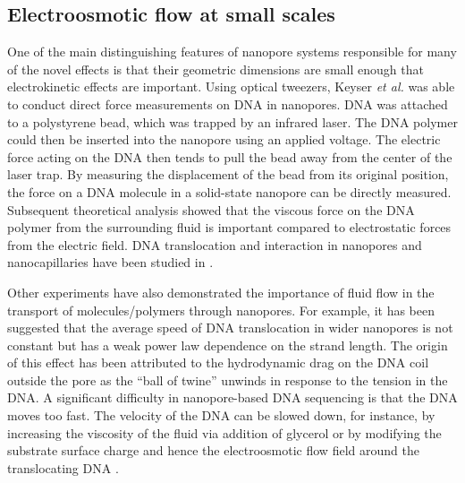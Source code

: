 \subsection{Electroosmotic flow at small scales}
One of the main distinguishing features of nanopore systems responsible for many of the novel effects is that their geometric dimensions are small enough that electrokinetic effects are important. Using optical tweezers, Keyser {\it et al.} \cite{Keyser2006,VanDorp2009} was able to conduct direct force measurements on DNA in nanopores. DNA was attached to a polystyrene bead, which was trapped by an infrared laser. The DNA polymer could then be inserted into the nanopore using an applied voltage. The electric force acting on the DNA then tends to pull the bead away from the center of the laser trap. By measuring the displacement of the bead from its original position, the force on a DNA molecule in a solid-state nanopore can be directly measured. Subsequent theoretical analysis \cite{ghosal2006electrophoresis,ghosal2007effect,Ghosal2007} showed that the viscous force on the DNA polymer from the surrounding fluid is important compared to electrostatic forces from the electric field. DNA translocation and interaction in nanopores and nanocapillaries have been studied in \cite{laohakunakorn2013dna,thacker2012studying,ghosal2012capstan}.

Other experiments have also demonstrated the importance of fluid flow in the transport of molecules\//polymers through nanopores. For example, it has been suggested that the average speed of DNA translocation 
in wider nanopores \cite{storm_nanolett05} is not constant but has a weak power law dependence on the strand length. 
The origin of this effect has been attributed to the hydrodynamic drag on the DNA coil outside the pore as the ``ball of twine'' unwinds in response to the tension in the DNA. A significant difficulty in nanopore-based DNA sequencing is that the DNA moves too fast. The velocity of the DNA can be slowed down, for instance, by increasing the viscosity of the fluid via addition of glycerol \cite{fologea2005slowing} or by modifying the substrate surface charge and hence the electroosmotic flow field around the translocating DNA \cite{ghosal2007effect}. 

